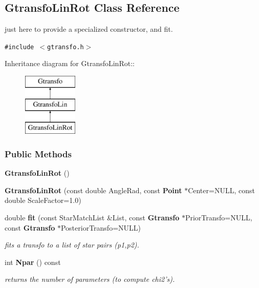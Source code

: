 \subsection{Gtransfo\-Lin\-Rot  Class Reference}
\label{class_gtransfolinrot}
just here to provide a specialized constructor, and fit. 


{\tt \#include $<$gtransfo.h$>$}

Inheritance diagram for Gtransfo\-Lin\-Rot::\begin{figure}[H]
\begin{center}
\leavevmode
\includegraphics[height=3cm]{class_gtransfolinrot}
\end{center}
\end{figure}
\subsubsection*{Public Methods}
\begin{CompactItemize}
\item 
{}
{\bf Gtransfo\-Lin\-Rot} ()\label{class_gtransfolinrot_a0}

\item 
{}
{\bf Gtransfo\-Lin\-Rot} (const double Angle\-Rad, const {\bf Point} $\ast$Center=NULL, const double Scale\-Factor=1.0)\label{class_gtransfolinrot_a1}

\item 
double {\bf fit} (const Star\-Match\-List \&List, const {\bf Gtransfo} $\ast$Prior\-Transfo=NULL, const {\bf Gtransfo} $\ast$Posterior\-Transfo=NULL)
\begin{CompactList}\small\item\em fits a transfo to a list of star pairs (p1,p2).\item\end{CompactList}\item 
{}
int {\bf Npar} () const\label{class_gtransfolinrot_a3}

\begin{CompactList}\small\item\em returns the number of parameters (to compute chi2's).\item\end{CompactList}\end{CompactItemize}



